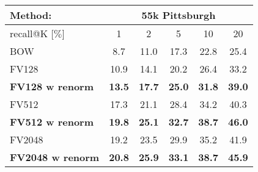 \begin{table}[t!]
\begin{centering}
	\begin{tabularx}{0.89\linewidth}{|l|c c c c c|}
		\hline 
		\rowcolor{maroon!50}
		Method: & \multicolumn{5}{c|}{55k Pittsburgh} \\
		\hline 
		\hline 
		\rowcolor{maroon!50}
		recall@K [$\%$] & 1 & 2 & 5 & 10 & 20\\
		\hline
		\rowcolor{maroon!10}
		BOW       & 8.7 & 11.0 & 17.3 & 22.8 & 25.4  \\
    \hline
		\rowcolor{maroon!10}
		FV128     & 10.9 & 14.1 & 20.2 & 26.4 & 33.2 \\
		\rowcolor{maroon!10}
		\textbf{FV128 w renorm}  & \textbf{13.5}  &  \textbf{17.7}  &  \textbf{25.0}  &  \textbf{31.8}  &  \textbf{39.0} \\
    \hline  
    \rowcolor{maroon!10}
    FV512   & 17.3 &  21.1 &  28.4 &  34.2 &  40.3 \\      
    \rowcolor{maroon!10}
    \rowcolor{maroon!10}
    \textbf{FV512 w renorm}  & \textbf{19.8} &  \textbf{25.1} &  \textbf{32.7}  & \textbf{38.7} &  \textbf{46.0} \\
    \hline
		\rowcolor{maroon!10}
		FV2048        & 19.2 & 23.5 & 29.9 &  35.2 &  41.9 \\
		\rowcolor{maroon!10}
        \rowcolor{maroon!10}
        \textbf{FV2048 w renorm}  & \textbf{20.8} & \textbf{25.9} & \textbf{33.1} & \textbf{38.7} & \textbf{45.9} \\
        \hline

\end{tabularx}
\end{centering}
\end{table}
